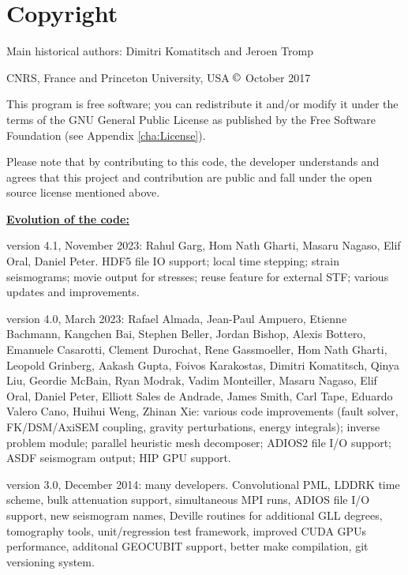 
\chapter*{Copyright}

Main historical authors: Dimitri Komatitsch and Jeroen Tromp

CNRS, France and Princeton University, USA\newline
$\copyright$ October 2017\newline

\noindent
This program is free software; you can redistribute it and/or modify
it under the terms of the GNU General Public License as published
by the Free Software Foundation (see Appendix \ref{cha:License}).\newline

\noindent
Please note that by contributing to this code, the developer understands and agrees that this project and contribution
are public and fall under the open source license mentioned above.\newline

\noindent
\textbf{\underline{Evolution of the code:}}\newline

version 4.1, November 2023:
Rahul Garg, Hom Nath Gharti, Masaru Nagaso, Elif Oral, Daniel Peter.
HDF5 file IO support; local time stepping; strain seismograms; movie output for stresses; 
reuse feature for external STF; various updates and improvements.\newline


version 4.0, March 2023:
Rafael Almada, Jean-Paul Ampuero, Etienne Bachmann, Kangchen Bai, Stephen Beller, Jordan Bishop, Alexis Bottero,
Emanuele Casarotti, Clement Durochat, Rene Gassmoeller, Hom Nath Gharti, Leopold Grinberg, Aakash Gupta,
Foivos Karakostas, Dimitri Komatitsch, Qinya Liu, Geordie McBain, Ryan Modrak, Vadim Monteiller, Masaru Nagaso, Elif Oral,
Daniel Peter, Elliott Sales de Andrade,  James Smith, Carl Tape, Eduardo Valero Cano, Huihui Weng, Zhinan Xie:
various code improvements (fault solver, FK/DSM/AxiSEM coupling, gravity perturbations, energy integrals);
inverse problem module; parallel heuristic mesh decomposer; ADIOS2 file I/O support;
ASDF seismogram output; HIP GPU support.\newline


version 3.0, December 2014: many developers.
Convolutional PML, LDDRK time scheme, bulk attenuation support, simultaneous MPI runs,
ADIOS file I/O support, new seismogram names,
Deville routines for additional GLL degrees, tomography tools, unit/regression test framework,
improved CUDA GPUs performance, additonal GEOCUBIT support, better make compilation,
git versioning system. \newline


